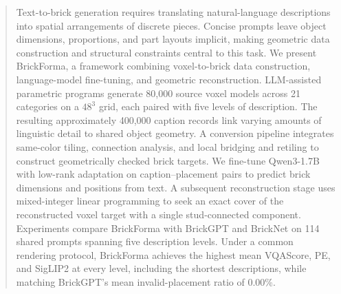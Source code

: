 \begin{abstract}
    Text-to-brick generation requires translating natural-language descriptions into spatial arrangements of discrete pieces. Concise prompts leave object dimensions, proportions, and part layouts implicit, making geometric data construction and structural constraints central to this task. We present BrickForma, a framework combining voxel-to-brick data construction, language-model fine-tuning, and geometric reconstruction. LLM-assisted parametric programs generate 80,000 source voxel models across 21 categories on a $48^3$ grid, each paired with five levels of description. The resulting approximately 400,000 caption records link varying amounts of linguistic detail to shared object geometry. A conversion pipeline integrates same-color tiling, connection analysis, and local bridging and retiling to construct geometrically checked brick targets. We fine-tune Qwen3-1.7B with low-rank adaptation on caption--placement pairs to predict brick dimensions and positions from text. A subsequent reconstruction stage uses mixed-integer linear programming to seek an exact cover of the reconstructed voxel target with a single stud-connected component. Experiments compare BrickForma with BrickGPT and BrickNet on 114 shared prompts spanning five description levels. Under a common rendering protocol, BrickForma achieves the highest mean VQAScore, PE, and SigLIP2 at every level, including the shortest descriptions, while matching BrickGPT's mean invalid-placement ratio of 0.00\%.
\end{abstract}
